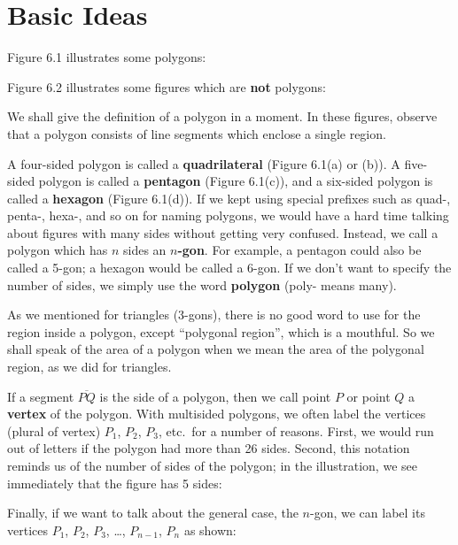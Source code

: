 \documentclass[12pt]{book} %
\begin{document}
\section{Basic Ideas}

Figure 6.1 illustrates some polygons:


Figure 6.2 illustrates some figures which are \textbf{not} polygons:


We shall give the definition of a polygon in a moment. In these figures, observe that a polygon consists of line segments which enclose a single region.

A four-sided polygon is called a \textbf{quadrilateral} (Figure 6.1(a) or (b)). A five-sided polygon is called a \textbf{pentagon} (Figure 6.1(c)), and a six-sided polygon is called a \textbf{hexagon} (Figure 6.1(d)). If we kept using special prefixes such as quad-, penta-, hexa-, and so on for naming polygons, we would have a hard time talking about figures with many sides without getting very confused. Instead, we call a polygon which has $n$ sides an \textbf{$n$-gon}. For example, a pentagon could also be called a 5-gon; a hexagon would be called a 6-gon. If we don't want to specify the number of sides, we simply use the word \textbf{polygon} (poly- means many).

As we mentioned for triangles (3-gons), there is no good word to use for the region inside a polygon, except ``polygonal region'', which is a mouthful. So we shall speak of the area of a polygon when we mean the area of the polygonal region, as we did for triangles.

If a segment $\overline{PQ}$ is the side of a polygon, then we call point $P$ or point $Q$ a \textbf{vertex} of the polygon. With multisided polygons, we often label the vertices (plural of vertex) $P_1$, $P_2$, $P_3$, etc.\ for a number of reasons. First, we would run out of letters if the polygon had more than 26 sides. Second, this notation reminds us of the number of sides of the polygon; in the illustration, we see immediately that the figure has 5 sides:


Finally, if we want to talk about the general case, the $n$-gon, we can label its vertices $P_1$, $P_2$, $P_3$, \dots, $P_{n-1}$, $P_n$ as shown:

\end{document}
